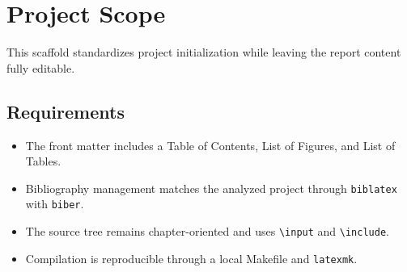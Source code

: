 \section{Project Scope}
\label{sec:project-scope}

This scaffold standardizes project initialization while leaving the report content fully editable.

\subsection{Requirements}
\label{subsec:requirements}

\begin{itemize}
  \item The front matter includes a Table of Contents, List of Figures, and List of Tables.
  \item Bibliography management matches the analyzed project through \texttt{biblatex} with \texttt{biber}.
  \item The source tree remains chapter-oriented and uses \texttt{\textbackslash input} and \texttt{\textbackslash include}.
  \item Compilation is reproducible through a local Makefile and \texttt{latexmk}.
\end{itemize}
